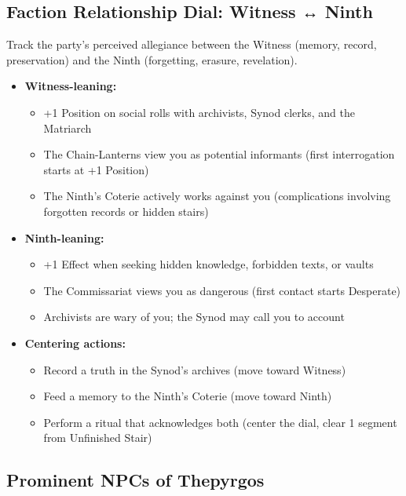 \subsection*{Faction Relationship Dial: Witness ↔ Ninth}
\label{sec:thepyrgos-dial}

Track the party's perceived allegiance between the Witness (memory, record, preservation) and the Ninth (forgetting, erasure, revelation).

\begin{itemize}
\item \textbf{Witness-leaning:}
  \begin{itemize}
    \item +1 Position on social rolls with archivists, Synod clerks, and the Matriarch
    \item The Chain-Lanterns view you as potential informants (first interrogation starts at +1 Position)
    \item The Ninth's Coterie actively works against you (complications involving forgotten records or hidden stairs)
  \end{itemize}

\item \textbf{Ninth-leaning:}
  \begin{itemize}
    \item +1 Effect when seeking hidden knowledge, forbidden texts, or vaults
    \item The Commissariat views you as dangerous (first contact starts Desperate)
    \item Archivists are wary of you; the Synod may call you to account
  \end{itemize}

\item \textbf{Centering actions:}
  \begin{itemize}
    \item Record a truth in the Synod's archives (move toward Witness)
    \item Feed a memory to the Ninth's Coterie (move toward Ninth)
    \item Perform a ritual that acknowledges both (center the dial, clear 1 segment from Unfinished Stair)
  \end{itemize}
\end{itemize}

\subsection*{Prominent NPCs of Thepyrgos}
\label{sec:thepyrgos-npcs}

